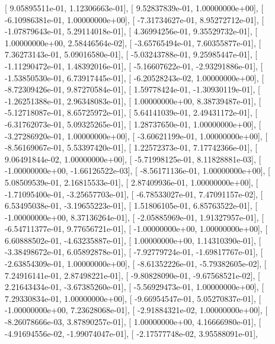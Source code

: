 \documentclass{article}
\begin{document}
       [  9.05895511e-01,   1.12306663e-01],
       [  9.52837839e-01,   1.00000000e+00],
       [ -6.10986381e-01,   1.00000000e+00],
       [ -7.31734627e-01,   8.95272712e-01],
       [ -1.07879643e-01,   5.29114018e-01],
       [  4.36994256e-01,   9.35529732e-01],
       [  1.00000000e+00,   2.58446564e-02],
       [ -3.65765494e-01,   7.60355877e-01],
       [  7.36273143e-01,   5.09016580e-01],
       [ -5.03243788e-01,   9.25985447e-01],
       [ -1.11290472e-01,   1.48392016e-01],
       [ -5.16607622e-01,  -2.93291886e-01],
       [ -1.53850530e-01,   6.73917445e-01],
       [ -6.20528243e-02,   1.00000000e+00],
       [ -8.72309426e-01,   9.87270584e-01],
       [  1.59778424e-01,  -1.30930119e-01],
       [ -1.26251388e-01,   2.96348083e-01],
       [  1.00000000e+00,   8.38739487e-01],
       [ -5.12718087e-01,   8.65725972e-01],
       [  5.64141039e-01,   2.49431172e-01],
       [ -6.31762073e-01,   5.09325265e-01],
       [  1.28737650e-01,   1.00000000e+00],
       [ -3.27286920e-01,   1.00000000e+00],
       [ -3.60621199e-01,   1.00000000e+00],
       [ -8.56169067e-01,   5.53397420e-01],
       [  1.22572373e-01,   7.17742366e-01],
       [  9.06491844e-02,   1.00000000e+00],
       [ -5.71998125e-01,   8.11828881e-03],
       [ -1.00000000e+00,  -1.66126522e-03],
       [ -8.56171136e-01,   1.00000000e+00],
       [  5.08509539e-01,   2.16815533e-01],
       [  2.87409936e-01,   1.00000000e+00],
       [ -1.71095400e-01,  -3.25657703e-01],
       [ -6.78533027e-01,   7.47091157e-02],
       [  6.53495038e-01,  -3.19655223e-01],
       [  1.51806105e-01,   6.85763522e-01],
       [ -1.00000000e+00,   8.37136264e-01],
       [ -2.05885969e-01,   1.91327957e-01],
       [ -6.54711377e-01,   9.77656721e-01],
       [ -1.00000000e+00,   1.00000000e+00],
       [  6.60888502e-01,  -4.63235887e-01],
       [  1.00000000e+00,   1.14310390e-01],
       [ -3.38498672e-01,   6.05892878e-01],
       [ -7.92779724e-01,  -1.69817767e-01],
       [ -2.63854309e-01,   1.00000000e+00],
       [ -8.61352226e-01,  -5.79382605e-02],
       [  7.24916141e-01,   2.87498221e-01],
       [ -9.80828090e-01,  -9.67568521e-02],
       [  2.21643434e-01,  -3.67385260e-01],
       [ -5.56929473e-01,   1.00000000e+00],
       [  7.29330834e-01,   1.00000000e+00],
       [ -9.66954547e-01,   5.05270837e-01],
       [ -1.00000000e+00,   7.23628068e-01],
       [ -2.91884321e-02,   1.00000000e+00],
       [ -8.26078666e-03,   3.87890257e-01],
       [  1.00000000e+00,   4.16666980e-01],
       [ -4.91694556e-02,  -1.99074047e-01],
       [ -2.17577748e-02,   3.95588091e-01],
\end{document}

